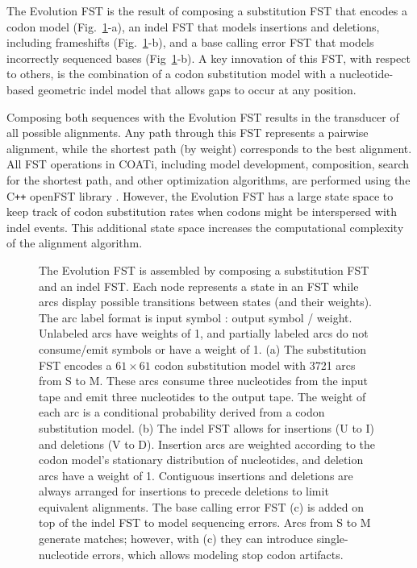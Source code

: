 The Evolution FST is the result of composing a substitution FST that encodes a codon model (Fig.\ \ref{fig:evolution-fst}-a), an indel FST that models insertions and deletions, including frameshifts (Fig.\ \ref{fig:evolution-fst}-b), and a base calling error FST that models incorrectly sequenced bases (Fig~\ref{fig:evolution-fst}-b).
A key innovation of this FST, with respect to others, is the combination of a codon substitution model with a nucleotide-based geometric indel model that allows gaps to occur at any position.

Composing both sequences with the Evolution FST results in the transducer of all possible alignments.
Any path through this FST represents a pairwise alignment, while the shortest path (by weight) corresponds to the best alignment.
All FST operations in COATi, including model development, composition, search for the shortest path, and other optimization algorithms, are performed using the C\texttt{++} openFST library \citep{allauzen2007openfst}.
However, the Evolution FST has a large state space to keep track of codon substitution rates when codons might be interspersed with indel events. This additional state space increases the computational complexity of the alignment algorithm.

\begin{figure}[!ht]
\centering
\hspace*{-4em}\resizebox{0.95\textwidth}{!}{}
\par
\caption[Evolution FST]{The Evolution FST is assembled by composing a substitution FST and an indel FST.
Each node represents a state in an FST while arcs display possible transitions between states (and their weights). The arc label format is input symbol : output symbol / weight. Unlabeled arcs have weights of 1, and partially labeled arcs do not consume/emit symbols or have a weight of 1.
(a) The substitution FST encodes a $61 \times 61 $ codon substitution model with 3721 arcs from S to M. These arcs consume three nucleotides from the input tape and emit three nucleotides to the output tape. The weight of each arc is a conditional probability derived from a codon substitution model.
(b) The indel FST allows for insertions (U to I) and deletions (V to D). Insertion arcs are weighted according to the codon model's stationary distribution of nucleotides, and deletion arcs have a weight of 1. Contiguous insertions and deletions are always arranged for insertions to precede deletions to limit equivalent alignments. The base calling error FST (c) is added on top of the indel FST to model sequencing errors. Arcs from S to M generate matches; however, with (c) they can introduce single-nucleotide errors, which allows modeling stop codon artifacts.}
\label{fig:evolution-fst}
\end{figure}

